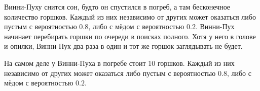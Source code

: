 \documentclass[12pt, addpoints, answers]{exam} %
\begin{document}
\begin{questions}
\begin{comment}
\part Наконец Привалов глядит на упавшую монету и видит, что выпал «орёл». Вероятность того, что монета --- неразменный пятак, равна \fillin[...].
\end{parts}

\end{comment}

\question Винни-Пуху снится сон, будто он спустился в погреб, а там бесконечное количество горшков. Каждый из них независимо от других может оказаться либо пустым с вероятностью $0.8$, либо с мёдом с вероятностью $0.2$. Винни-Пух начинает перебирать горшки по очереди в поисках полного. Хотя у него в голове и опилки, Винни-Пух два раза в один и тот же горшок заглядывать не будет. 

\question На самом деле у Винни-Пуха в погребе стоит 10 горшков. Каждый из них независимо от других может оказаться либо пустым с вероятностью $0.8$, либо с мёдом с вероятностью $0.2$. 
\end{questions}
\end{document}
